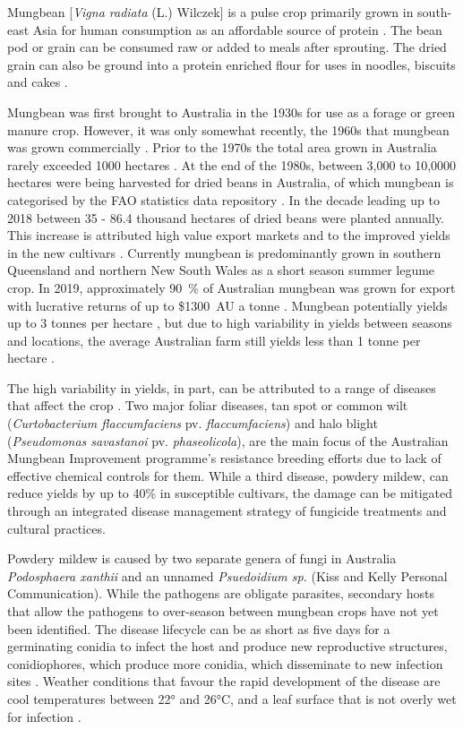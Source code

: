 \documentclass[agronomy,article,submit,moreauthors,pdftex]{mdpi}
\begin{document}

Mungbean {[}\emph{Vigna radiata} (L.) Wilczek{]} is a pulse crop
primarily grown in south-east Asia for human consumption as an
affordable source of protein \citep{Lambrides2007}. The bean pod or
grain can be consumed raw or added to meals after sprouting. The dried
grain can also be ground into a protein enriched flour for uses in
noodles, biscuits and cakes \citep{Chankaew2013}.

Mungbean was first brought to Australia in the 1930s for use as a forage
or green manure crop. However, it was only somewhat recently, the 1960s
that mungbean was grown commercially \citep{Lawn1978, Chauhan2018}.
Prior to the 1970s the total area grown in Australia rarely exceeded
1000 hectares \citep{Lawn1978}. At the end of the 1980s, between 3,000
to 10,0000 hectares were being harvested for dried beans in Australia,
of which mungbean is categorised by the FAO statistics data repository
\citep{FAOSTAT}. In the decade leading up to 2018 between 35 - 86.4
thousand hectares of dried beans were planted annually. This increase is
attributed high value export markets and to the improved yields in the
new cultivars \citep{Clarry2016}. Currently mungbean is predominantly
grown in southern Queensland and northern New South Wales as a short
season summer legume crop. In 2019, approximately 90~\% of Australian
mungbean was grown for export with lucrative returns of up to \$1300~AU
a tonne \citep{QueenslandGovernment2019}. Mungbean potentially yields up
to 3 tonnes per hectare \citep{ThomasRobert2004}, but due to high
variability in yields between seasons and locations, the average
Australian farm still yields less than 1 tonne per hectare
\citep{Chauhan2018}.

The high variability in yields, in part, can be attributed to a range of
diseases that affect the crop \citep{Kelly2017a}. Two major foliar
diseases, tan spot or common wilt (\emph{Curtobacterium flaccumfaciens}
pv. \emph{flaccumfaciens}) and halo blight (\emph{Pseudomonas
savastanoi} pv. \emph{phaseolicola}), are the main focus of the
Australian Mungbean Improvement programme's resistance breeding efforts
due to lack of effective chemical controls for them. While a third
disease, powdery mildew, can reduce yields by up to 40\%
\citep{Chankaew2013} in susceptible cultivars, the damage can be
mitigated through an integrated disease management strategy of fungicide
treatments and cultural practices.

Powdery mildew is caused by two separate genera of fungi in Australia
\emph{Podosphaera xanthii} and an unnamed \emph{Psuedoidium sp.} (Kiss
and Kelly Personal Communication). While the pathogens are obligate
parasites, secondary hosts that allow the pathogens to over-season
between mungbean crops have not yet been identified. The disease
lifecycle can be as short as five days for a germinating conidia to
infect the host and produce new reproductive structures, conidiophores,
which produce more conidia, which disseminate to new infection sites
\citep{Sparks2017}. Weather conditions that favour the rapid development
of the disease are cool temperatures between 22° and 26°C, and a leaf
surface that is not overly wet for infection \citep{Kelly2017a}.
\end{document}
